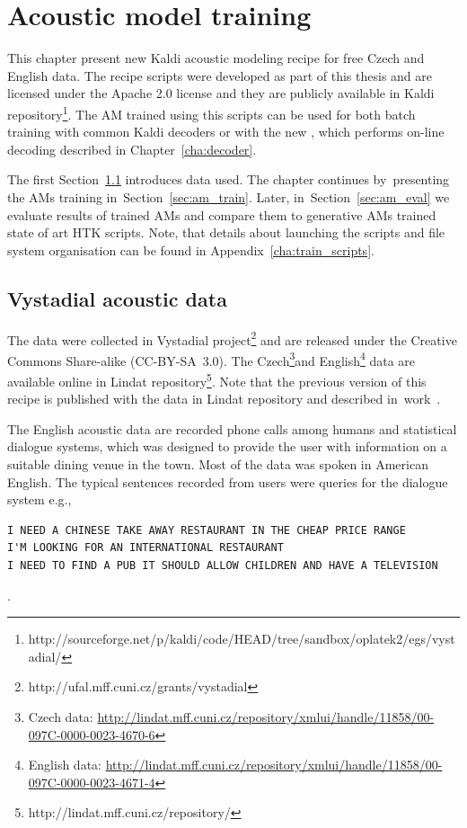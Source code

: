 \chapter{Acoustic model training}
\label{cha:train}

This chapter present new Kaldi acoustic modeling recipe for free Czech and English data.
The recipe scripts were developed as part of this thesis and are licensed under the Apache 2.0 license and they are publicly available in Kaldi repository\footnote{http://sourceforge.net/p/kaldi/code/HEAD/tree/sandbox/oplatek2/egs/vystadial/}.
The \ac{AM} trained using this scripts can be used for both batch training with common Kaldi decoders or with the new , which performs on-line decoding described in Chapter~\ref{cha:decoder}.

The first Section~\ref{sec:data} introduces data used. 
The chapter continues by~presenting the \acp{AM} training in~Section~\ref{sec:am_train}. 
Later, in~Section~\ref{sec:am_eval} we evaluate results of trained \acp{AM} and compare them to generative \acp{AM} trained state of art \ac{HTK} scripts.
Note, that details about launching the scripts and file system organisation can be found in Appendix~\ref{cha:train_scripts}.  

\section{Vystadial acoustic data}
\label{sec:data}

The data were collected in Vystadial project\footnote{http://ufal.mff.cuni.cz/grants/vystadial} and are released under the Creative Commons Share-alike (CC-BY-SA~3.0). 
The Czech\footnote{Czech data: \url{http://lindat.mff.cuni.cz/repository/xmlui/handle/11858/00-097C-0000-0023-4670-6}}and English\footnote{English data: \url{http://lindat.mff.cuni.cz/repository/xmlui/handle/11858/00-097C-0000-0023-4671-4}} data are available online in Lindat repository\footnote{{http://lindat.mff.cuni.cz/repository/}}.
Note that the previous version of this recipe is published with the data in Lindat repository and described in~work~\cite{korvas_2014}.

The English acoustic data are recorded phone calls among humans and statistical dialogue systems,
which was designed to provide the user with information on a suitable dining venue in the town.
Most of the data was spoken in American English.
The typical sentences recorded from users were queries for the dialogue system e.g.,
\begin{verbatim}
I NEED A CHINESE TAKE AWAY RESTAURANT IN THE CHEAP PRICE RANGE
I'M LOOKING FOR AN INTERNATIONAL RESTAURANT
I NEED TO FIND A PUB IT SHOULD ALLOW CHILDREN AND HAVE A TELEVISION
\end{verbatim}.

